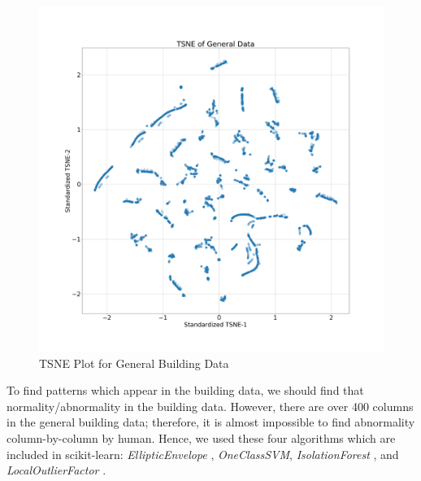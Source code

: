 \documentclass[aps, 10pt, a4paper]{article}
\begin{document}
            \begin{figure}[htbp]
                \centering
                \includegraphics[width=0.3 \linewidth]{figures/TsneGeneral.png}
                \caption{TSNE Plot for General Building Data}
                \label{fig:generalbuilding}
            \end{figure}
        
            To find patterns which appear in the building data, we should find that normality/abnormality in the building data. However, there are over 400 columns in the general building data; therefore, it is almost impossible to find abnormality column-by-column by human. Hence, we used these four algorithms which are included in scikit-learn: \textit{EllipticEnvelope} \cite{ref:normal1}, \textit{OneClassSVM}, \textit{IsolationForest} \cite{ref:normal2, ref:normal3}, and \textit{LocalOutlierFactor} \cite{ref:normal4}.
            
\end{document}
